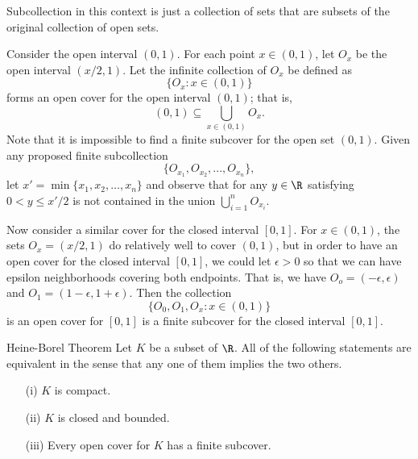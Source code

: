 Subcollection in this context is just a collection of sets that are subsets of the original collection of open sets.

\begin{example}{}{}
Consider the open interval \( (0,1) \). For each point \( x \in (0,1) \), let \( O_x \) be the open interval \( (x/2, 1) \). Let the infinite collection of \( O_x \) be defined as 
\[ \{ O_{x} : x \in (0,1) \}  \]
forms an open cover for the open interval \( (0,1) \); that is, 
\[  (0,1) \subseteq \bigcup_{ x \in (0,1) } O_x.  \]
Note that it is impossible to find a finite subcover for the open set \( (0,1) \). Given any proposed finite subcollection 
\[ \{ O_{x_1}, O_{x_2}, ..., O_{x_n} \}, \]
let \( x' = \min \{ x_1, x_2, \dots, x_n \}  \) and observe that for any \( y \in \R  \) satisfying \( 0 < y \leq x' /2  \) is not contained in the union \( \bigcup_{ i=1 }^{ n } O_{x_i} \). 
\end{example}

Now consider a similar cover for the closed interval \( [0,1] \). For \( x \in (0,1) \), the sets \( O_x = (x/2, 1) \) do relatively well to cover \( (0,1) \), but in order to have an open cover for the closed interval \( [0,1] \), we could let \( \epsilon > 0   \) so that we can have epsilon neighborhoods covering both endpoints. That is, we have \( O_o = (-\epsilon , \epsilon ) \) and \( O_1 = (1 - \epsilon, 1 + \epsilon ) \). Then the collection 
\[ \{ O_0, O_1, O_x : x \in (0,1) \}  \]
is an open cover for \( [0,1] \) is a finite subcover for the closed interval \( [0,1] \).

\begin{theorem}{Heine-Borel Theorem}
Let \( K \) be a subset of \( \R \). All of the following statements are equivalent in the sense that any one of them implies the two others. 
\begin{enumerate}
    \item[(i)] \( K \) is compact.
    \item[(ii)] \( K \) is closed and bounded.
    \item[(iii)] Every open cover for \( K \) has a finite subcover.
\end{enumerate}
\end{theorem}%

